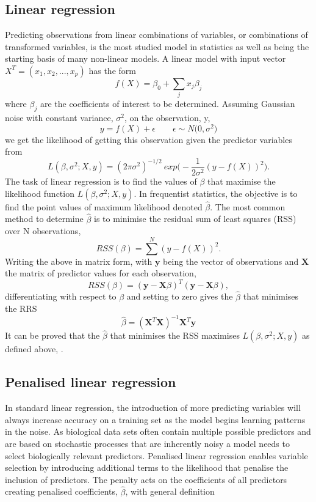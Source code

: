 \documentclass[../main.tex]{subfiles}
\begin{document}
\subsection{Linear regression}

Predicting observations from linear combinations of variables, or combinations of transformed variables, is the most studied model in statistics as well as being the starting basis of many non-linear models.
A linear model with input vector $X^T = (x_1, x_2, ..., x_p)$ has the form
$$f(X) = \beta_0 +\sum_j x_j\beta_j$$
where $\beta_j$ are the coefficients of interest to be determined.
Assuming Gaussian noise with constant variance, $\sigma^2$, on the observation, y, 
$$y = f(X) + \epsilon \qquad \epsilon \sim N \big(0,\sigma^2\big) $$
we get the likelihood of getting this observation given the predictor variables from
$$L(\beta,\sigma^2;X,y)=(2\pi\sigma^2)^{-1/2}\ exp\Big( -\frac{1}{2\sigma^2} (y-f(X))^2 \Big).$$
The task of linear regression is to find the values of $\beta$ that maximise the likelihood function $L(\beta,\sigma^2;X,y)$.
In frequentist statistics, the objective is to find the point values of maximum likelihood denoted $\hat\beta$.
The most common method to determine $\hat\beta$ is to minimise the residual sum of least squares (RSS) over N observations,
$$RSS(\beta) = \sum^N(y-f(X))^2.$$
Writing the above in matrix form, with $\mathbf{y}$ being the vector of observations and $\mathbf{X}$ the matrix of predictor values for each observation,
$$RSS(\beta) = (\mathbf{y}-\mathbf{X}\beta)^T(\mathbf{y}-\mathbf{X}\beta),$$
differentiating with respect to $\beta$ and setting to zero gives the $\hat\beta$ that minimises the RRS
$$\hat\beta = (\mathbf{X}^T\mathbf{X})^{-1}\mathbf{X}^T\mathbf{y}$$
It can be proved that the $\hat\beta$ that minimises the RSS maximises $L(\beta,\sigma^2;X,y)$ as defined above, \parencite{Hastie2009}.

\subsection{Penalised linear regression}

In standard linear regression, the introduction of more predicting variables will always increase accuracy on a training set as the model begins learning patterns in the noise.
As biological data sets often contain multiple possible predictors and are based on stochastic processes that are inherently noisy a model needs to select biologically relevant predictors.
Penalised linear regression enables variable selection by introducing additional terms to the likelihood that penalise the inclusion of predictors.
The penalty acts on the coefficients of all predictors creating penalised coefficients, $\hat{\beta}$, with general definition
\end{document}
